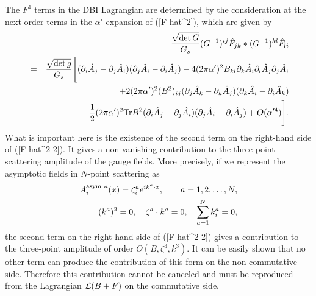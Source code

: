 \documentclass[a4paper,12pt]{article}
\begin{document}
The $F^4$ terms in the DBI Lagrangian
are determined by the consideration
at the next order terms in the $\alpha'$ expansion of (\ref{F-hat^2}),
which are given by
\begin{eqnarray}
&& \frac{\sqrt{\det G}}{G_s}
(G^{-1})^{ij} \hat{F}_{jk} \ast (G^{-1})^{kl} \hat{F}_{li}
\nonumber \\
&=& \frac{\sqrt{\det g}}{G_s} \Biggl[
( \partial_i \hat{A}_j  - \partial_j \hat{A}_i )
( \partial_j \hat{A}_i  - \partial_i \hat{A}_j )
-4 (2 \pi \alpha')^2 B_{kl}
\partial_k \hat{A}_i \partial_l \hat{A}_j \partial_j \hat{A}_i
\nonumber \\
&& +2 (2 \pi \alpha')^2 (B^2)_{ij}
( \partial_j \hat{A}_k  - \partial_k \hat{A}_j )
( \partial_k \hat{A}_i  - \partial_i \hat{A}_k )
\nonumber \\
&& -\frac{1}{2} (2 \pi \alpha')^2 {\rm Tr} B^2
( \partial_i \hat{A}_j  - \partial_j \hat{A}_i )
( \partial_j \hat{A}_i  - \partial_i \hat{A}_j )
+ O(\alpha'^4) \Biggr].
\label{F-hat^2-2}
\end{eqnarray}
What is important here is the existence of the second term
on the right-hand side of (\ref{F-hat^2-2}).
It gives a non-vanishing contribution to the three-point scattering
amplitude of the gauge fields.
More precisely, if we represent the asymptotic fields
in $N$-point scattering as
\begin{eqnarray}
A^{{\rm asym}~a}_i (x) = \zeta^a_i e^{i k^a \cdot x},
\qquad a= 1, 2, \ldots, N,
\label{configuration} \\
( k^a )^2 =0, \quad \zeta^a \cdot k^a =0, \quad
\sum_{a=1}^N k^a_i =0,
\label{on-shell-condition}
\end{eqnarray}
the second term on the right-hand side
of (\ref{F-hat^2-2}) gives a contribution
to the three-point amplitude
of order $O(B, \zeta^3, k^3)$.
It can be easily shown that
no other term can produce the contribution of this form
on the non-commutative side.
Therefore this contribution cannot be canceled
and must be reproduced from the Lagrangian ${\cal L} (B+F)$
on the commutative side.
\end{document}
